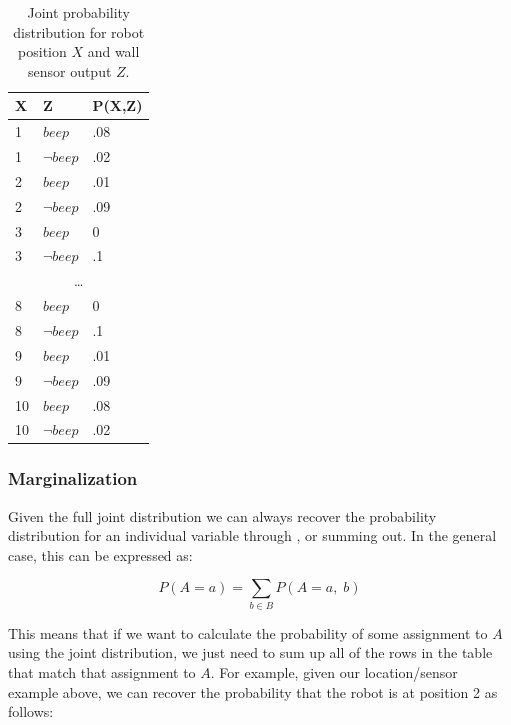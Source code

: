 \begin{table}[h!]
\begin{center}
 \begin{tabular}[b]{|l|l|l|}
    \hline
    X  & Z           & P(X,Z) \\
    \hline
    1  & $beep$      & .08    \\
    \hline
    1  & $\neg beep$ & .02    \\
    \hline
    2  & $beep$      & .01   \\
    \hline
    2  & $\neg beep$ & .09   \\
    \hline
    3  & $beep$      & 0      \\
    \hline
    3  & $\neg beep$ & .1     \\
    \hline
    \multicolumn{3}{|c|}{\ldots}   \\
    \hline
    8  & $beep$      & 0      \\
    \hline
    8  & $\neg beep$ & .1     \\
    \hline
    9  & $beep$      & .01   \\
    \hline
    9  & $\neg beep$ & .09   \\
    \hline
    10 & $beep$      & .08     \\
    \hline
    10 & $\neg beep$ & .02    \\
    \hline
 \end{tabular}
\end{center}
\caption{Joint probability distribution for robot position $X$ and wall sensor output $Z$.}
\label{tab:joint}
\end{table}

\subsubsection{Marginalization}

Given the full joint distribution we can always recover the probability
distribution for an individual variable through , or
summing out. In the general case, this can be expressed as:

\begin{equation} \label{eq:marginalization}
  P(A = a) = \sum_{b \in B} P(A = a,\; b)
\end{equation}

This means that if we want to calculate the probability of some
assignment to $A$ using the joint distribution, we just need to sum up
all of the rows in the table that match that assignment to $A$. For
example, given our location/sensor example above, we can recover the
probability that the robot is at position 2 as follows:

